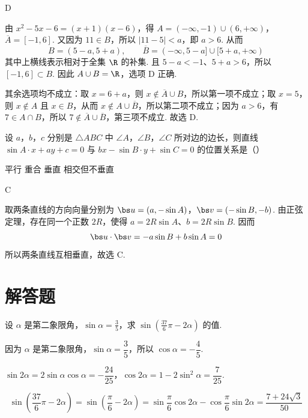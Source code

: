 \begin{answer}
D
\end{answer}

\begin{solution}
由 \(x^2-5x-6=(x+1)(x-6)\)，得
\(A=(-\infty,-1)\cup(6,+\infty)\)，\(\overline A=[-1,6]\).
又因为 \(11\in B\)，所以 \(|11-5|<a\)，即 \(a>6\). 从而
\[
B=(5-a,5+a),\qquad \overline B=(-\infty,5-a]\cup[5+a,+\infty)
\]
其中上横线表示相对于全集 \(\R\) 的补集. 且 \(5-a<-1\)、\(5+a>6\)，所以 \([-1,6]\subset B\). 因此
\(A\cup B=\R\)，选项 D 正确.

其余选项均不成立：取 \(x=6+a\)，则 \(x\notin\overline A\cup B\)，所以第一项不成立；取 \(x=5\)，则 \(x\notin A\) 且 \(x\in B\)，从而 \(x\notin A\cup\overline B\)，所以第二项不成立；因为 \(a>6\)，有 \(7\in A\cap B\)，所以 \(7\notin\overline A\cup\overline B\)，第三项不成立. 故选 D.
\end{solution}

\begin{problem}
设 \(a\)，\(b\)，\(c\) 分别是 \(\triangle ABC\) 中 \(\angle A\)，\(\angle B\)，\(\angle C\) 所对边的边长，则直线 \(\sin A \cdot x + ay + c = 0\) 与 \(bx - \sin B \cdot y + \sin C = 0\) 的位置关系是（\quad）

\choices
    {平行}
    {重合}
    {垂直}
    {相交但不垂直}
\end{problem}

\begin{answer}
C
\end{answer}

\begin{solution}
取两条直线的方向向量分别为
\(\bs u=(a,-\sin A)\)，\(\bs v=(-\sin B,-b)\).
由正弦定理，存在同一个正数 \(2R\)，使得
\(a=2R\sin A\)、\(b=2R\sin B\). 因而
\[
\bs u\cdot\bs v=-a\sin B+b\sin A=0
\]
所以两条直线互相垂直，故选 C.
\end{solution}

\section{解答题}

\begin{problem}
设 \(\alpha \) 是第二象限角，\(\sin\alpha=\frac{3}{5} \)，求 \(\sin\left(\frac{37}{6}\pi-2\alpha\right) \) 的值.
\end{problem}

\begin{solution}
因为 \(\alpha\) 是第二象限角，\(\sin\alpha=\dfrac{3}{5}\)，所以 \(\cos\alpha=-\dfrac{4}{5}\).

\(\sin2\alpha=2\sin\alpha\cos\alpha=-\dfrac{24}{25}\)，\(\cos2\alpha=1-2\sin^2\alpha=\dfrac{7}{25}\).

\[
\sin\left(\frac{37}{6}\pi-2\alpha\right)=\sin\left(\frac{\pi}{6}-2\alpha\right)=\sin\frac{\pi}{6}\cos2\alpha-\cos\frac{\pi}{6}\sin2\alpha=\frac{7+24\sqrt{3}}{50}
\]
\end{solution}

